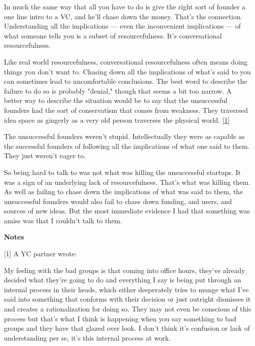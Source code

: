 In much the same
                    way that all you have to do is give the right sort of
                    founder a one line intro to a VC, and he'll chase down the
                    money. That's the connection. Understanding all the
                    implications --- even the inconvenient implications
                    --- of what someone tells you is a subset of
                    resourcefulness. It's conversational resourcefulness.

Like
                    real world resourcefulness, conversational resourcefulness
                    often means doing things you don't want to. Chasing down all
                    the implications of what's said to you can sometimes lead to
                    uncomfortable conclusions. The best word to describe the
                    failure to do so is probably "denial," though that seems a
                    bit too narrow. A better way to describe the situation would
                    be to say that the unsuccessful founders had the sort of
                    conservatism that comes from weakness. They traversed idea
                    space as gingerly as a very old person traverses the
                    physical world.
                    [\href{\#f1n}{1}]

The unsuccessful founders weren't stupid.
                    Intellectually they were as capable as the successful
                    founders of following all the implications of what one said
                    to them. They just weren't eager to.

So being
                    hard to talk to was not what was killing the unsuccessful
                    startups. It was a sign of an underlying lack of
                    resourcefulness. That's what was killing them. As well as
                    failing to chase down the implications of what was said to
                    them, the unsuccessful founders would also fail to chase
                    down funding, and users, and sources of new ideas. But the
                    most immediate evidence I had that something was amiss was
                    that I couldn't talk to them.





\textbf{Notes}

[1] A YC partner wrote:

My feeling with the bad
                    groups is that coming into office hours, they've already
                    decided what they're going to do and everything I say is
                    being put through an internal process in their heads, which
                    either desperately tries to munge what I've said into
                    something that conforms with their decision or just outright
                    dismisses it and creates a rationalization for doing so.
                    They may not even be conscious of this process but that's
                    what I think is happening when you say something to bad
                    groups and they have that glazed over look. I don't think
                    it's confusion or lack of understanding per se, it's this
                    internal process at work.

